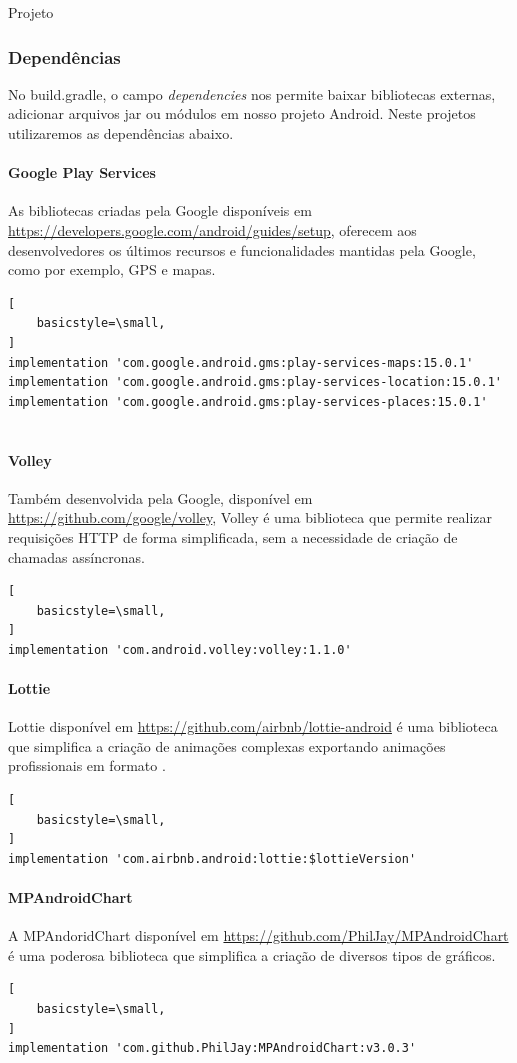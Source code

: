 \documentclass[
	12pt,				%
	openright,			%
	twoside,			%
	a4paper,			%
	english,			%
	french,				%
	spanish,			%
	brazil				%
	]{abntex2}
\begin{document}
\begin{chapter}{Projeto}
\subsubsection{Dependências}
 No build.gradle, o campo \textit{dependencies} nos permite baixar bibliotecas externas, adicionar arquivos jar ou módulos em nosso projeto Android. Neste projetos utilizaremos as dependências abaixo.
 
   \paragraph{Google Play Services}
   As bibliotecas criadas pela Google disponíveis em \url{https://developers.google.com/android/guides/setup}, oferecem aos desenvolvedores os últimos recursos e funcionalidades mantidas pela Google, como por exemplo, GPS e mapas.
       \begin{lstlisting}[
    basicstyle=\small,
] 
implementation 'com.google.android.gms:play-services-maps:15.0.1'
implementation 'com.google.android.gms:play-services-location:15.0.1'
implementation 'com.google.android.gms:play-services-places:15.0.1'
  
\end{lstlisting}
   \paragraph{Volley}
   Também desenvolvida pela Google, disponível em \url{https://github.com/google/volley}, Volley é uma biblioteca que permite realizar requisições HTTP de forma simplificada, sem a necessidade de criação de chamadas assíncronas.
       \begin{lstlisting}[
    basicstyle=\small,
]
implementation 'com.android.volley:volley:1.1.0'  
\end{lstlisting}

\paragraph{Lottie}
\label{Lottie}
   Lottie disponível em \url{https://github.com/airbnb/lottie-android} é uma  biblioteca que simplifica a criação de animações complexas exportando animações profissionais em formato .
        \begin{lstlisting}[
    basicstyle=\small,
] 
implementation 'com.airbnb.android:lottie:$lottieVersion'
\end{lstlisting}

   \paragraph{MPAndroidChart}
   A  MPAndoridChart disponível em \url{https://github.com/PhilJay/MPAndroidChart} é uma poderosa biblioteca que simplifica a criação de diversos tipos de gráficos. 
        \begin{lstlisting}[
    basicstyle=\small,
] 
implementation 'com.github.PhilJay:MPAndroidChart:v3.0.3'
  

\end{lstlisting}
\end{chapter}
\end{document}

